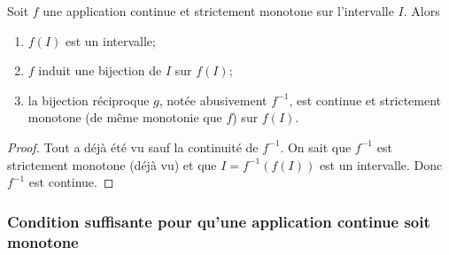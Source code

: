 \begin{theo}
  Soit $f$ une application continue et strictement monotone sur l'intervalle $I$. Alors
  \begin{enumerate}
  \item $f(I)$ est un intervalle;
  \item $f$ induit une bijection de $I$ sur $f(I)$;
  \item la bijection réciproque $g$, notée abusivement $f^{-1}$, est continue et strictement monotone (de même monotonie que $f$) sur $f(I)$.
  \end{enumerate}
\end{theo}
\begin{proof}
  Tout a déjà été vu sauf la continuité de $f^{-1}$. On sait que $f^{-1}$ est strictement monotone (déjà vu) et que $I=f^{-1}(f(I))$ est un intervalle. Donc $f^{-1}$ est continue.
\end{proof}

\subsubsection[Pour qu'une application continue soit monotone]{Condition suffisante pour qu'une application continue soit monotone}

